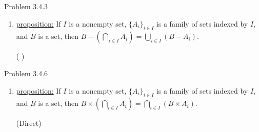 \documentclass{article}
\theoremstyle{definition}
\begin{document}

	\noindent Problem 3.4.3
	\vspace{0.3cm}

	\begin{enumerate}
		\item[vi]

		\underline{proposition:}
		If $I$ is a nonempty set, $\{A_i\}_{i \in I}$ is a family of sets indexed by $I$, and $B$ is a set, then $B - (\bigcap_{i\in I} A_i) = \bigcup_{i\in I}(B - A_i)$.

		\vspace{.3cm}

		 ( )

		\vspace{.2cm}
	\end{enumerate}
	\vspace{1cm}


	\noindent Problem 3.4.6
	\vspace{0.3cm}

	\begin{enumerate}
		\item[2]
		\underline{proposition:}
		If $I$ is a nonempty set, $\{A_i\}_{i \in I}$ is a family of sets indexed by $I$, and $B$ is a set, then $B\times(\bigcap_{i \in I} A_i) = \bigcap_{i \in I}(B \times A_i)$.

		\vspace{.3cm}

		 (Direct)



		\vspace{.2cm}
	\end{enumerate}
	\vspace{1cm}

\end{document}
